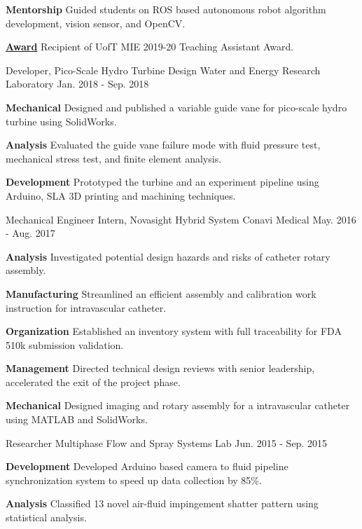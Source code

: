 \begin{cventries}
{\begin{cvitems}
{			}
			\item {
				\textbf{Mentorship} Guided students on ROS based autonomous robot algorithm development, vision sensor, and OpenCV.
			}
			\item \textbf{\href{https://www.mie.utoronto.ca/congratulations-2019-20-teaching-assistant-award-winners-lap-tak-chu-richard-hu-behzad-khamidehi-ben-leung-and-khalil-sidawi/}{Award}} Recipient of UofT MIE 2019-20 Teaching Assistant Award.
		\end{cvitems}
	}
	\cventry
	{Developer, Pico-Scale Hydro Turbine Design}
	{Water and Energy Research Laboratory}
	{Jan. 2018 - Sep. 2018}
	{}
	{
		\begin{cvitems}
			\item {\textbf{Mechanical} Designed and published a variable guide vane for pico-scale hydro turbine using SolidWorks.}
			\item {\textbf{Analysis} Evaluated the guide vane failure mode with fluid pressure test, mechanical stress test, and finite element analysis.}
			\item {\textbf{Development} Prototyped the turbine and an experiment pipeline using Arduino, SLA 3D printing and machining techniques.}
		\end{cvitems}
	}
	\cventry
	{Mechanical Engineer Intern, Novasight Hybrid System}
	{Conavi Medical} 
	{May. 2016 - Aug. 2017}
	{}
	{
		\begin{cvitems}
			\item {
				\textbf{Analysis} Investigated potential design hazards and risks of catheter rotary assembly.
			}
			\item {
				\textbf{Manufacturing} Streamlined an efficient assembly and calibration work instruction for intravascular catheter.}
			\item {
				\textbf{Organization} Established an inventory system with full traceability for FDA 510k submission validation.}
			\item {
				\textbf{Management} Directed technical design reviews with senior leadership, accelerated the exit of the project phase.}
			\item {
				\textbf{Mechanical} Designed imaging and rotary assembly for a intravascular catheter using MATLAB and SolidWorks.
			}
		\end{cvitems}
	}
	\cventry
	{Researcher}
	{Multiphase Flow and Spray Systems Lab} 
	{Jun. 2015 - Sep. 2015}
	{}
	{
		\begin{cvitems}
			\item {
				\textbf{Development} Developed Arduino based camera to fluid pipeline synchronization system to speed up data collection by 85\%.
			}
			\item {
				\textbf{Analysis} Classified 13 novel air-fluid impingement shatter pattern using statistical analysis.}
		\end{cvitems}
	}  
\end{cventries}
